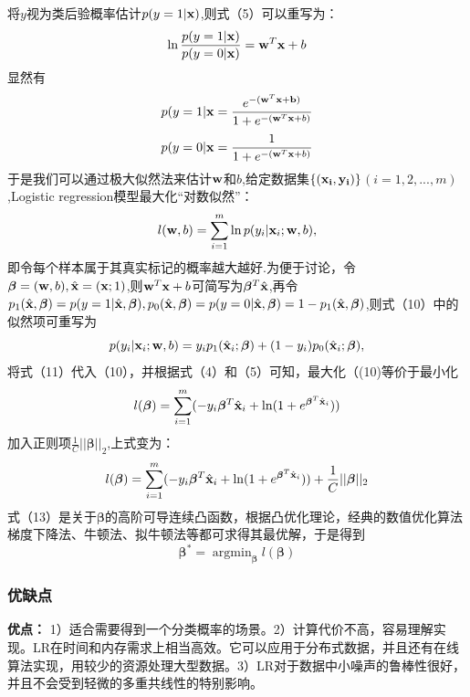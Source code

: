 \documentclass[a4paper]{article}
\begin{document}
\par
将$y$视为类后验概率估计$p(y=1|{\bf x})$,则式（5）可以重写为：
\begin{equation}\ln \frac{p(y=1|{\bf x})}{p(y=0|{\bf x})}={\bf w}^T{\bf x}+ b\end{equation}
显然有
\begin{equation}p(y=1|{\bf x}=\frac{e ^ {-({\bf w}^T{\bf x}+{\bf b})}}{1 + e ^ {-({\bf w}^T{\bf x}+b)}}\end{equation}
\begin{equation}p(y=0|{\bf x}=\frac{1}{1 + e ^ {-({\bf w}^T{\bf x}+b)}}\end{equation}
于是我们可以通过极大似然法来估计${\bf w}$和$b$,给定数据集$\{(\bf { {x_i},y_i)}\}$$(i=1,2,...,m)$,Logistic regression模型最大化“对数似然”：
\begin{equation}l({\bf w},b) = \sum_{i=1}^m \ln p(y_i|{\bf x}_i;{\bf w},b),\end{equation}
即令每个样本属于其真实标记的概率越大越好.为便于讨论，令${\bm \beta} = ({\bf w},b),\hat {\bf x}=({\bf x};1)$,则${\bf w}^T{\bf x}+ b$可简写为${\bm \beta}^T \hat{\bf x}$,再令$p_1({\hat{\bf x}},{\bm \beta})=p(y=1|{\hat{\bf x}},{\bm \beta}),p_0({\hat{\bf x}},{\bm \beta})=p(y=0|{\hat{\bf x}},{\bm \beta})=1-p_1({\hat{\bf x}},{\bm \beta})$,则式（10）中的似然项可重写为
\begin{equation} 
p(y_i|{\bf x}_i;{\bf w},b)=y_ip_1({\hat{\bf x}}_i;{\bm \beta})+(1-y_i)p_0({\hat{\bf x}}_i;{\bm \beta}),
\end{equation}
将式（11）代入（10），并根据式（4）和（5）可知，最大化（(10)等价于最小化
\begin{equation}l({\bm \beta})=\sum_{i=1}^m (-y_i{\bm \beta}^T{\hat{\bf x}}_i+\ln(1+e^{{\bm \beta}^T{\hat{\bf x}}_i})) \end{equation}
加入正则项$\frac{1}{C}||{\bm \beta}||_2$,上式变为：
\begin{equation}l({\bm \beta})=\sum_{i=1}^m (-y_i{\bm \beta}^T{\hat{\bf x}}_i+\ln(1+e^{{\bm \beta}^T{\hat{\bf x}}_i}))+\frac{1}{C}||{\bm \beta}||_2\end{equation}
式（13）是关于${\bm \beta}$的高阶可导连续凸函数，根据凸优化理论，经典的数值优化算法梯度下降法、牛顿法、拟牛顿法等都可求得其最优解，于是得到
\begin{equation}\bm{{\beta}^*}=\mathop{\arg\min}_{\bm \beta} l({\bm \beta})\end{equation}

\subsubsection{优缺点}
\textbf{优点：}
1）适合需要得到一个分类概率的场景。2）计算代价不高，容易理解实现。LR在时间和内存需求上相当高效。它可以应用于分布式数据，并且还有在线算法实现，用较少的资源处理大型数据。3）LR对于数据中小噪声的鲁棒性很好，并且不会受到轻微的多重共线性的特别影响。
\end{document}
